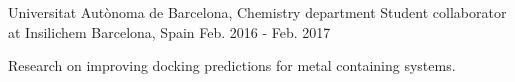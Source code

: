 \begin{cventries}
  \cventry
    {Universitat Autònoma de Barcelona, Chemistry department} %
    {Student collaborator at Insilichem} %
    {Barcelona, Spain} %
    {Feb. 2016 - Feb. 2017} %
    {
      \begin{cvitems} %
        \item {Research on improving docking predictions for metal containing systems.}
      \end{cvitems}
    }

\end{cventries}
